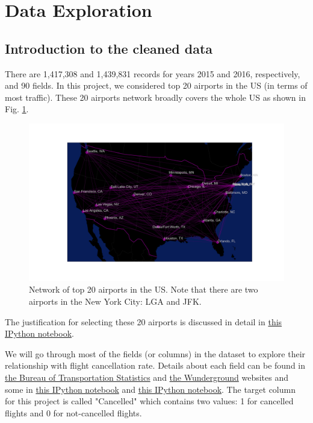 \documentclass[12pt]{article}
\begin{document}
\section{Data Exploration}
\label{sec:eda}
\subsection{Introduction to the cleaned data}
\label{subsec:dataintro}
There are 1,417,308 and 1,439,831 records for years 2015 and 2016, respectively, and 90 fields. In this project, we considered top 20 airports in the US (in terms of most traffic). These 20 airports network broadly covers the whole US as shown in Fig. \ref{fig:map}. 
\begin{figure}[h!]
\begin{center}
\includegraphics[width=6in]{map.pdf}
\end{center}
\caption{\label{fig:map}
Network of top 20 airports in the US. Note that there are two airports in the New York City: LGA and JFK.}
\end{figure}
The justification for selecting these 20 airports is discussed in detail in \href{https://github.com/aajains/springboard-datascience-intensive/blob/master/capstone_project/DataAcquisitionMerging/data_acquisition_merging.ipynb}{this IPython notebook}. 


We will go through most of the fields (or columns) in the dataset to explore their relationship with flight cancellation rate. Details about each field can be found in \href{https://www.transtats.bts.gov/Fields.asp?Table_ID=236}{the Bureau of Transportation Statistics} and \href{https://www.wunderground.com/weather/api/d/docs?d=resources/phrase-glossary}{the Wunderground} websites and some in \href{https://github.com/aajains/springboard-datascience-intensive/blob/master/capstone_project/DataAcquisitionMerging/history_calc.ipynb}{this IPython notebook} and \href{https://github.com/aajains/springboard-datascience-intensive/blob/master/capstone_project/DataCleaning/data_cleaning.ipynb}{this IPython notebook}. The target column for this project is called  "Cancelled" which contains two values: 1 for cancelled flights and 0 for not-cancelled flights. 
\end{document}
